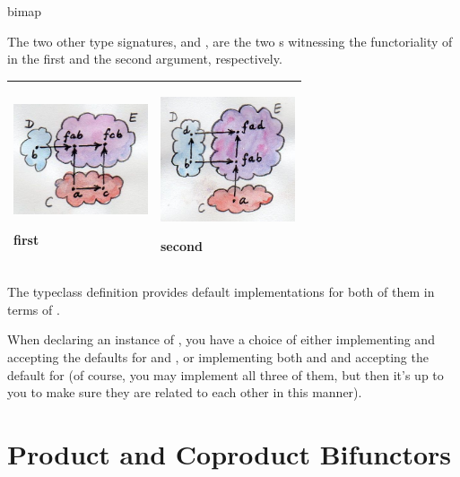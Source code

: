 bimap

The two other type signatures,  and , are
the two s witnessing the functoriality of  in the
first and the second argument, respectively.

\begin{longtable}[]{@{}ll@{}}
\toprule
\begin{minipage}[t]{0.48\columnwidth}\raggedright\strut
\hypertarget{attachment_4071}{}
\includegraphics[width=1.56250in]{images/first.jpg}

first\strut
\end{minipage} & \begin{minipage}[t]{0.48\columnwidth}\raggedright\strut
\hypertarget{attachment_4072}{}
\includegraphics[width=1.56250in]{images/second.jpg}

second\strut
\end{minipage}\tabularnewline
\bottomrule
\end{longtable}

The typeclass definition provides default implementations for both of
them in terms of .

When declaring an instance of , you have a choice of
either implementing  and accepting the defaults for
 and , or implementing both 
and  and accepting the default for  (of
course, you may implement all three of them, but then it's up to you to
make sure they are related to each other in this manner).

\section{Product and Coproduct
Bifunctors}\label{product-and-coproduct-bifunctors}

